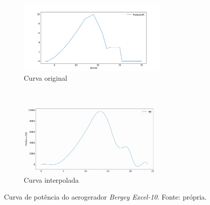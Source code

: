 
\begin{figure}[H]
	\centering
	\begin{subfigure}[b]{\textwidth}
		\centering
		\includegraphics[width=0.8\textwidth]{../img/bergey.png}
		\caption{Curva original}\label{fig:bergey}
	\end{subfigure}
	\\ \vspace{0.5cm}
	\begin{subfigure}[b]{\textwidth}
		\centering
		\includegraphics[width=0.8\textwidth]{../img/bergey_corr.png}
		\caption{Curva interpolada}\label{fig:bergey_corr}
	\end{subfigure}
	\caption{Curva de potência do aerogerador \emph{Bergey Excel-10}. Fonte: própria.}\label{fig:wind:power}
\end{figure}
